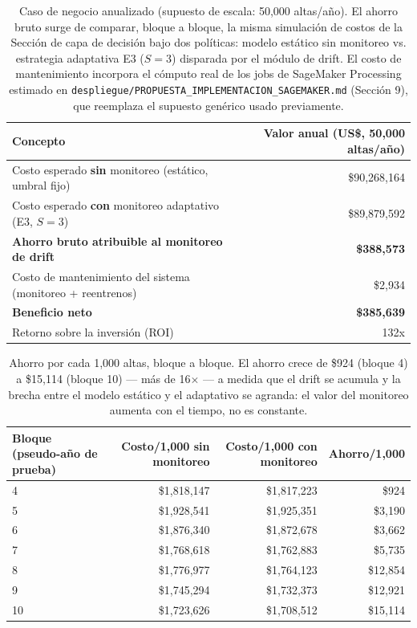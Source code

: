 \begin{table}[H]
\centering\small
\begin{tabular}{lr}
\toprule
Concepto & Valor anual (US\$, 50,000 altas/año) \\
\midrule
Costo esperado \textbf{sin} monitoreo (estático, umbral fijo) & \$90,268,164 \\
Costo esperado \textbf{con} monitoreo adaptativo (E3, $S=3$) & \$89,879,592 \\
\textbf{Ahorro bruto atribuible al monitoreo de drift} & \textbf{\$388,573} \\
Costo de mantenimiento del sistema (monitoreo + reentrenos) & \$2,934 \\
\textbf{Beneficio neto} & \textbf{\$385,639} \\
Retorno sobre la inversión (ROI) & 132x \\
\bottomrule
\end{tabular}
\caption{Caso de negocio anualizado (supuesto de escala: 50,000 altas/año). El ahorro bruto surge de comparar, bloque a bloque, la misma simulación de costos de la Sección de capa de decisión bajo dos políticas: modelo estático sin monitoreo vs. estrategia adaptativa E3 ($S=3$) disparada por el módulo de drift. El costo de mantenimiento incorpora el cómputo real de los jobs de SageMaker Processing estimado en \texttt{despliegue/PROPUESTA\_IMPLEMENTACION\_SAGEMAKER.md} (Sección 9), que reemplaza el supuesto genérico usado previamente.}
\label{tab:caso-negocio}
\end{table}

\bigskip
\begin{table}[H]
\centering\small
\begin{tabular}{lrrr}
\toprule
Bloque (pseudo-año de prueba) & Costo/1,000 sin monitoreo & Costo/1,000 con monitoreo & Ahorro/1,000 \\
\midrule
4 & \$1,818,147 & \$1,817,223 & \$924 \\
5 & \$1,928,541 & \$1,925,351 & \$3,190 \\
6 & \$1,876,340 & \$1,872,678 & \$3,662 \\
7 & \$1,768,618 & \$1,762,883 & \$5,735 \\
8 & \$1,776,977 & \$1,764,123 & \$12,854 \\
9 & \$1,745,294 & \$1,732,373 & \$12,921 \\
10 & \$1,723,626 & \$1,708,512 & \$15,114 \\
\bottomrule
\end{tabular}
\caption{Ahorro por cada 1,000 altas, bloque a bloque. El ahorro crece de \$924 (bloque 4) a \$15,114 (bloque 10) --- más de 16$\times$ --- a medida que el drift se acumula y la brecha entre el modelo estático y el adaptativo se agranda: el valor del monitoreo aumenta con el tiempo, no es constante.}
\label{tab:caso-negocio-bloque}
\end{table}
